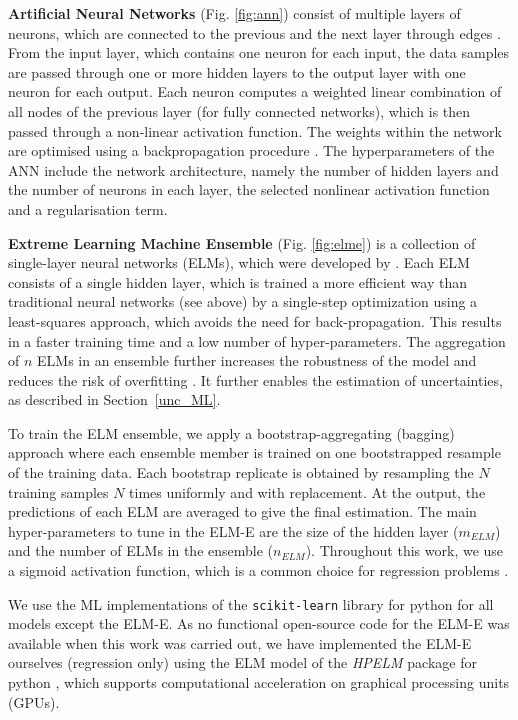 \textbf{Artificial Neural Networks} (Fig. \ref{fig:ann}) consist of multiple layers of neurons, which are connected to the previous and the next layer through edges \cite{rumelhart_learning_1986}. From the input layer, which contains one neuron for each input, the data samples are passed through one or more hidden layers to the output layer with one neuron for each output. Each neuron computes a weighted linear combination of all nodes of the previous layer (for fully connected networks), which is then passed through a non-linear activation function. The weights within the network are optimised using a backpropagation procedure \cite{lecun_efficient_2012}. The hyperparameters of the ANN include the network architecture, namely the number of hidden layers and the number of neurons in each layer, the selected nonlinear activation function and a regularisation term.  

\textbf{Extreme Learning Machine Ensemble }(Fig. \ref{fig:elme}) is a collection of single-layer neural networks (ELMs), which were developed by \citet{huang_extreme_2006}. Each ELM consists of a single hidden layer, which is trained a more efficient way than traditional neural networks (see above) by a single-step optimization using a least-squares approach, which avoids the need for back-propagation. This results in a faster training time and a low number of hyper-parameters. The aggregation of $n$ ELMs in an ensemble further increases the robustness of the model and reduces the risk of overfitting \cite{huang_trends_2015}. 
It further enables the estimation of uncertainties, as described in Section~\ref{unc_ML}.

To train the ELM ensemble, we apply a bootstrap-aggregating (bagging) approach \cite{breiman_bagging_1996} where each ensemble member is trained on one bootstrapped resample of the training data. Each bootstrap replicate is obtained by resampling the $N$ training samples $N$ times uniformly and with replacement. At the output, the predictions of each ELM are averaged to give the final estimation.
The main hyper-parameters to tune in the ELM-E are the size of the hidden layer ($m_{ELM}$) and the number of ELMs in the ensemble ($n_{ELM}$). Throughout this work, we use a sigmoid activation function, which is a common choice for regression problems \cite{huang_trends_2015}.

We use the ML implementations of the \texttt{scikit-learn} library for python \cite{pedregosa_scikit-learn:_2011} for all models except the ELM-E. As no functional open-source code for the ELM-E was available when this work was carried out, we have implemented the ELM-E ourselves (regression only) using the ELM model of the \textit{HPELM} package for python \cite{akusok_high-performance_2015}, which supports computational acceleration on graphical processing units (GPUs). 


